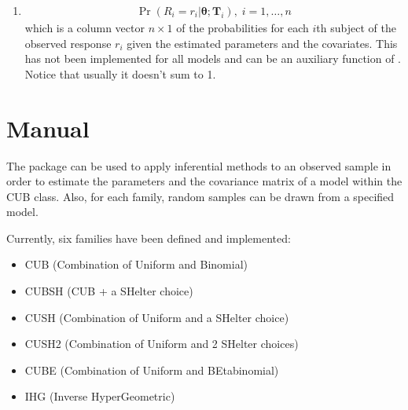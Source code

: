 \documentclass[letterpaper,10pt,english]{sphinxmanual}
\begin{document}
\begin{enumerate}
\item {} \begin{description}
\begin{equation*}
\begin{split}\Pr(R_i=r_i|\pmb\theta;\pmb T_i),\; i=1,\ldots,n\end{split}
\end{equation*}
\sphinxAtStartPar
which is a column vector \(n \times 1\) of the probabilities for each \(i\)\sphinxhyphen{}th subject
of the observed response \(r_i\) given the estimated parameters and the covariates.
This has not been implemented for all models and can be an auxiliary function
of . Notice that usually it doesn’t sum to 1.

\end{description}

\end{enumerate}

\begin{DUlineblock}{0em}
\item[] 
\item[] 
\item[] 
\end{DUlineblock}

\sphinxstepscope


\chapter{Manual}
\label{\detokenize{manual:manual}}\label{\detokenize{manual::doc}}
\sphinxAtStartPar
The package  can be used to apply inferential methods to an observed sample in order to
estimate the parameters and the covariance matrix of a model within the CUB class. Also, for each family,
random samples can be drawn from a specified model.

\sphinxAtStartPar
Currently, six families have been defined and implemented:
\begin{itemize}
\item {} 
\sphinxAtStartPar
CUB (Combination of Uniform and Binomial)

\item {} 
\sphinxAtStartPar
CUBSH (CUB + a SHelter choice)

\item {} 
\sphinxAtStartPar
CUSH (Combination of Uniform and a SHelter choice)

\item {} 
\sphinxAtStartPar
CUSH2 (Combination of Uniform and 2 SHelter choices)

\item {} 
\sphinxAtStartPar
CUBE (Combination of Uniform and BEta\sphinxhyphen{}binomial)

\item {} 
\sphinxAtStartPar
IHG (Inverse HyperGeometric)

\end{itemize}
\end{document}

